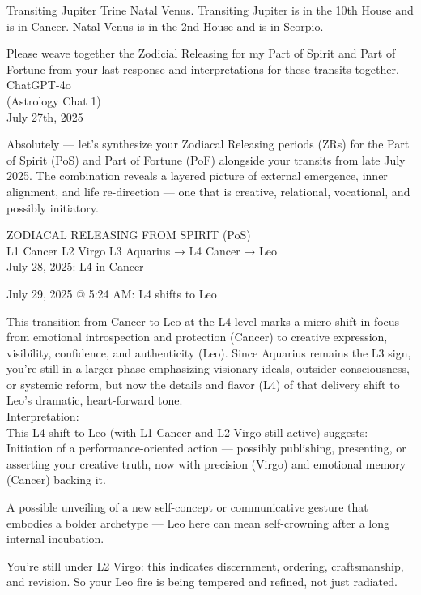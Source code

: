 \documentclass{article}
\begin{document}
Transiting Jupiter Trine Natal Venus. Transiting Jupiter is in the 10th
House and is in Cancer. Natal Venus is in the 2nd House and is in
Scorpio.

Please weave together the Zodicial Releasing for my Part of Spirit and
Part of Fortune from your last response and interpretations for these
transits together.\\
ChatGPT-4o\\
(Astrology Chat 1)\\
July 27th, 2025

Absolutely --- let's synthesize your Zodiacal Releasing periods (ZRs)
for the Part of Spirit (PoS) and Part of Fortune (PoF) alongside your
transits from late July 2025. The combination reveals a layered picture
of external emergence, inner alignment, and life re-direction --- one
that is creative, relational, vocational, and possibly initiatory.

 ZODIACAL RELEASING FROM SPIRIT (PoS)\\
L1 Cancer \textbar{} L2 Virgo \textbar{} L3 Aquarius → L4 Cancer → Leo\\
July 28, 2025: L4 in Cancer

July 29, 2025 @ 5:24 AM: L4 shifts to Leo

This transition from Cancer to Leo at the L4 level marks a micro shift
in focus --- from emotional introspection and protection (Cancer) to
creative expression, visibility, confidence, and authenticity (Leo).
Since Aquarius remains the L3 sign, you're still in a larger phase
emphasizing visionary ideals, outsider consciousness, or systemic
reform, but now the details and flavor (L4) of that delivery shift to
Leo's dramatic, heart-forward tone.\\
Interpretation:\\
This L4 shift to Leo (with L1 Cancer and L2 Virgo still active)
suggests:\\
Initiation of a performance-oriented action --- possibly publishing,
presenting, or asserting your creative truth, now with precision (Virgo)
and emotional memory (Cancer) backing it.

A possible unveiling of a new self-concept or communicative gesture that
embodies a bolder archetype --- Leo here can mean self-crowning after a
long internal incubation.

You're still under L2 Virgo: this indicates discernment, ordering,
craftsmanship, and revision. So your Leo fire is being tempered and
refined, not just radiated.
\end{document}
